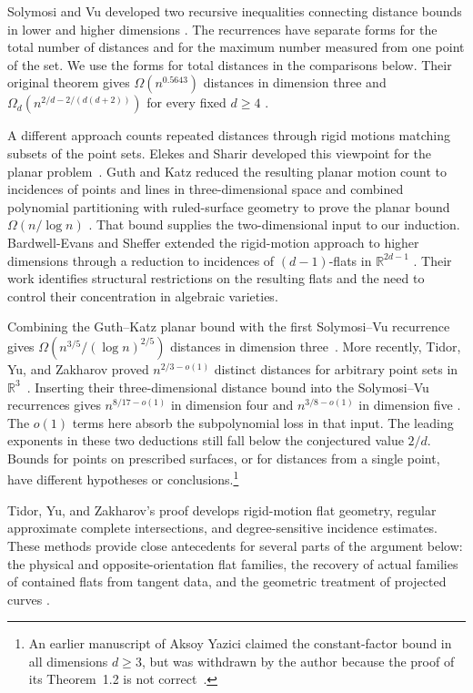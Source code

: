 Solymosi and Vu developed two recursive inequalities connecting
distance bounds in lower and higher dimensions
\cite[Theorems~2.1--2.2]{SolymosiVu2008}.
The recurrences have separate forms for the total number of distances
and for the maximum number measured from one point of the set. We use
the forms for total distances in the comparisons below. Their original theorem gives
\(\Omega(n^{0.5643})\) distances in dimension three and
\(\Omega_d(n^{2/d-2/(d(d+2))})\) for every fixed \(d\ge4\)
\cite[Theorem~1.1]{SolymosiVu2008}.

A different approach counts repeated distances through rigid motions
matching subsets of the point sets. Elekes and Sharir developed this viewpoint for the planar
problem~\cite{elekessharir2011}. Guth and Katz reduced the resulting
planar motion count to incidences of points and lines in three-dimensional
space and combined polynomial partitioning with ruled-surface geometry to prove
the planar bound \(\Omega(n/\log n)\)
\cite[Theorem~1.1 and Sections~2--4]{guthkatz2015}.
That bound supplies the two-dimensional input to our induction.
Bardwell-Evans and Sheffer extended the rigid-motion approach to
higher dimensions through a reduction to incidences of
\((d-1)\)-flats in \(\mathbb R^{2d-1}\)
\cite{BardwellEvansSheffer2019}. Their work identifies structural
restrictions on the resulting flats and the need to control their
concentration in algebraic varieties.

Combining the Guth--Katz planar bound with the first Solymosi--Vu
recurrence gives \(\Omega(n^{3/5}/(\log n)^{2/5})\) distances in
dimension three~\cite[Theorem~2.1]{SolymosiVu2008}.
More recently, Tidor, Yu, and Zakharov proved
\(n^{2/3-o(1)}\) distinct distances for arbitrary point sets in
\(\mathbb R^3\)~\cite[Theorem~1.1]{tidoryuzakharov2026}.
Inserting their three-dimensional distance bound into the Solymosi--Vu
recurrences gives \(n^{8/17-o(1)}\) in dimension four and
\(n^{3/8-o(1)}\) in dimension five
\cite[Corollaries~2.3 and~2.6]{SolymosiVu2008}.
The \(o(1)\) terms here absorb the subpolynomial loss in that input.
The leading exponents in these two deductions still fall below the
conjectured value \(2/d\).
Bounds for points on prescribed surfaces, or for distances from a
single point, have different hypotheses or conclusions.\footnote{An
earlier manuscript of Aksoy Yazici claimed
the constant-factor bound in all dimensions \(d\ge3\), but was
withdrawn by the author because the proof of its Theorem~1.2 is not
correct~\cite{AksoyYazici2020Withdrawn}.}

Tidor, Yu, and Zakharov's proof develops rigid-motion flat geometry,
regular approximate complete intersections, and degree-sensitive
incidence estimates. These methods provide close antecedents for
several parts of the argument below: the physical and
opposite-orientation flat families, the recovery of actual families
of contained flats from tangent data, and the geometric treatment of
projected curves
\cite[Sections~3--6 and~10.2--10.3]{tidoryuzakharov2026}.

